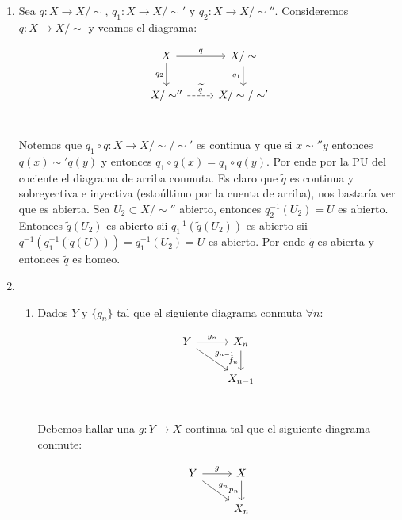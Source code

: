 \documentclass[11pt]{article}
\newcommand{\sett}[1]{\{#1\}}
\newenvironment{proof}[1][Demostraci\'on]{\begin{trivlist}
\item[\hskip \labelsep {\bfseries #1}]}{\end{trivlist}}
\newcommand{\qed}{\nobreak \ifvmode \relax \else
      \ifdim\lastskip<1.5em \hskip-\lastskip
      \hskip1.5em plus0em minus0.5em \fi \nobreak
      \vrule height0.75em width0.5em depth0.25em\fi}
\begin{document}
\begin{proof}

\begin{enumerate}

\item Sea $q : X \rightarrow X/ \sim$, $q_1: X \rightarrow X / \sim'$ y $q_2 : X \rightarrow X / \sim''$. Consideremos $q : X \rightarrow X/ \sim$ y veamos el diagrama:

\[
\begin{tikzcd}
X \arrow{r}{q} \arrow[swap]{d}{q_2} & X / \sim \arrow[swap]{d}{q_1} \\
X / \sim'' \arrow[dashed]{r}{\widetilde{q}} & X / \sim / \sim' \\ 
\end{tikzcd}
\]

Notemos que $q_1 \circ q : X \rightarrow X / \sim / \sim'$ es continua y que si $x \sim'' y $ entonces $q(x) \sim' q(y)$ y entonces $q_1 \circ q (x) = q_1 \circ q (y)$. Por ende por la PU del cociente el diagrama de arriba conmuta. Es claro que $\widetilde{q}$ es continua y sobreyectiva e inyectiva (esto\'ultimo por la cuenta de arriba), nos bastar\'ia ver que es abierta. Sea $U_2 \subset X / \sim''$ abierto, entonces $q_2^{-1}(U_2) =  U$ es abierto. Entonces $\widetilde{q}(U_2)$ es abierto sii $q_1^{-1}(\widetilde{q} (U_2))$ es abierto sii $q^{-1}(q_1 ^{-1}(\widetilde{q}(U))) = q_1^{-1}(U_2) = U$ es abierto. Por ende $\widetilde{q}$ es abierta y entonces $\widetilde{q}$ es homeo. \qed 

\item 

\begin{enumerate}

\item Dados $Y$ y $\sett{g_n}$ tal que el siguiente diagrama conmuta $\forall n$:

\[
\begin{tikzcd}
Y \arrow{r}{g_n} \arrow{dr}{g_{n-1}} & X_n \arrow[swap]{d}{f_n} \\
& X_{n-1} \\
\end{tikzcd}
\]

Debemos hallar una $g : Y \rightarrow X$ continua tal que el siguiente diagrama conmute:


\[
\begin{tikzcd}
Y \arrow{r}{g} \arrow{dr}{g_{n}} & X \arrow[swap]{d}{p_n} \\
& X_{n} \\
\end{tikzcd}
\]


\end{enumerate}
\end{enumerate}
\end{proof}
\end{document}
